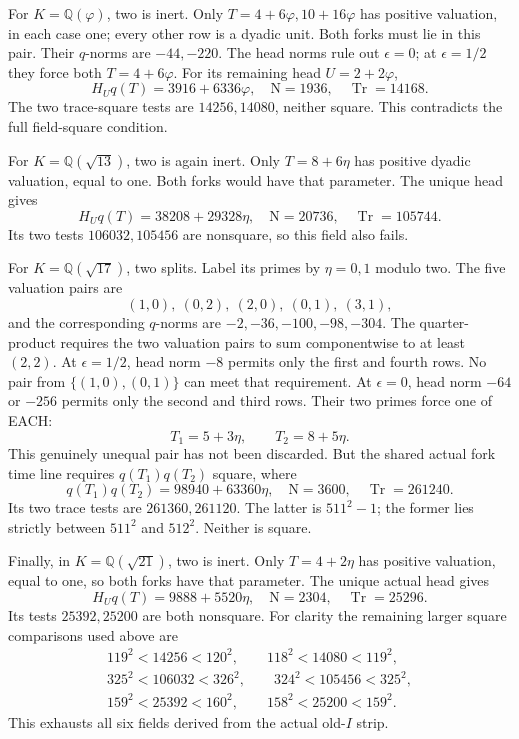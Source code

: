 \documentclass[11pt]{article}
\begin{document}
For \(K=\mathbb Q(\varphi)\), two
is inert.
Only \(T=4+6\varphi,10+16\varphi\)
has positive valuation, in each
case one; every other row is a
dyadic unit.
Both forks must lie in this pair.
Their \(q\)-norms are \(-44,-220\).
The head norms rule out
\(\epsilon=0\); at \(\epsilon=1/2\)
they force both \(T=4+6\varphi\).
For its remaining head \(U=2+2\varphi\),
\[
 H_Uq(T)=3916+6336\varphi,\quad
 \mathrm N=1936,\quad\operatorname{Tr}=14168 .
\]
The two trace-square tests are
\(14256,14080\), neither square.
This contradicts the full
field-square condition.

For \(K=\mathbb Q(\sqrt{13})\), two
is again inert.
Only \(T=8+6\eta\) has positive
dyadic valuation, equal to one.
Both forks would have that parameter.
The unique head gives
\[
 H_Uq(T)=38208+29328\eta,\quad
 \mathrm N=20736,\quad\operatorname{Tr}=105744 .
\]
Its two tests \(106032,105456\)
are nonsquare, so this field also
fails.

For \(K=\mathbb Q(\sqrt{17})\), two
splits.
Label its primes by \(\eta=0,1\)
modulo two.
The five valuation pairs are
\[
                (1,0),\ (0,2),\ (2,0),\ (0,1),\ (3,1),
\]
and the corresponding \(q\)-norms
are \(-2,-36,-100,-98,-304\).
The quarter-product requires the
two valuation pairs to sum
componentwise to at least \((2,2)\).
At \(\epsilon=1/2\), head norm
\(-8\) permits only the first and
fourth rows.
No pair from \(\{(1,0),(0,1)\}\)
can meet that requirement.
At \(\epsilon=0\), head norm
\(-64\) or \(-256\) permits only
the second and third rows.
Their two primes force one of EACH:
\[
                          T_1=5+3\eta,\qquad T_2=8+5\eta .
\]
This genuinely unequal pair has
not been discarded.
But the shared actual fork time
line requires \(q(T_1)q(T_2)\) square,
where
\[
 q(T_1)q(T_2)=98940+63360\eta,\quad
 \mathrm N=3600,\quad\operatorname{Tr}=261240 .
\]
Its two trace tests are
\(261360,261120\).
The latter is \(511^2-1\);
the former lies strictly between
\(511^2\) and \(512^2\).
Neither is square.

Finally, in \(K=\mathbb Q(\sqrt{21})\),
two is inert.
Only \(T=4+2\eta\) has positive
valuation, equal to one, so both
forks have that parameter.
The unique actual head gives
\[
 H_Uq(T)=9888+5520\eta,\quad
 \mathrm N=2304,\quad\operatorname{Tr}=25296 .
\]
Its tests \(25392,25200\) are both
nonsquare.
For clarity the remaining larger
square comparisons used above are
\[
\begin{gathered}
119^2<14256<120^2,\qquad118^2<14080<119^2,\\
325^2<106032<326^2,\qquad324^2<105456<325^2,\\
159^2<25392<160^2,\qquad158^2<25200<159^2 .
\end{gathered}
\]
This exhausts all six fields
derived from the actual old-\(I\)
strip.
\end{document}
